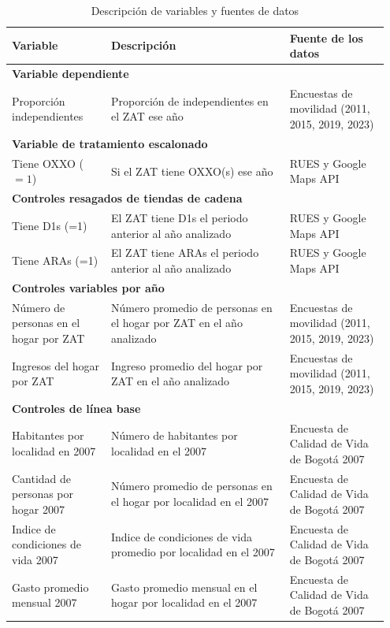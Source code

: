 \documentclass{article}
\begin{document}
\begin{longtable}{p{0.25\linewidth} p{0.45\linewidth} p{0.25\linewidth}}
\caption{Descripción de variables y fuentes de datos}
\label{tab:variables_descripcion}
\\
\toprule
\textbf{Variable} & \textbf{Descripción} & \textbf{Fuente de los datos} \\
\midrule
\endhead
\midrule
\multicolumn{3}{l}{\textbf{Variable dependiente}} \\
\midrule
Proporción independientes & Proporción de independientes en el ZAT ese año & Encuestas de movilidad (2011, 2015, 2019, 2023) \\
\midrule
\multicolumn{3}{l}{\textbf{Variable de tratamiento escalonado}} \\
\midrule
Tiene OXXO ($=1$) & Si el ZAT tiene OXXO(s) ese año & RUES y Google Maps API \\
\midrule
\multicolumn{3}{l}{\textbf{Controles resagados de tiendas de cadena}} \\
\midrule
Tiene D1s (=1) & El ZAT tiene D1s el periodo anterior al año analizado & RUES y Google Maps API \\
\midrule
Tiene ARAs (=1) & El ZAT tiene ARAs el periodo anterior al año analizado & RUES y Google Maps API \\
\midrule
\multicolumn{3}{l}{\textbf{Controles variables por año}} \\
\midrule
Número de personas en el hogar por ZAT & Número promedio de personas en el hogar por ZAT en el año analizado & Encuestas de movilidad (2011, 2015, 2019, 2023) \\
\midrule
Ingresos del hogar por ZAT & Ingreso promedio del hogar por ZAT en el año analizado & Encuestas de movilidad (2011, 2015, 2019, 2023) \\
\midrule
\multicolumn{3}{l}{\textbf{Controles de línea base}} \\
\midrule
Habitantes por localidad en 2007 & Número de habitantes por localidad en el 2007 & Encuesta de Calidad de Vida de Bogotá 2007 \\
\midrule
Cantidad de personas por hogar 2007 & Número promedio de personas en el hogar por localidad en el 2007 & Encuesta de Calidad de Vida de Bogotá 2007 \\
\midrule
Indice de condiciones de vida 2007 & Indice de condiciones de vida promedio por localidad en el 2007 & Encuesta de Calidad de Vida de Bogotá 2007 \\
\midrule
Gasto promedio mensual 2007 & Gasto promedio mensual en el hogar por localidad en el 2007 & Encuesta de Calidad de Vida de Bogotá 2007 \\

\end{longtable}
\end{document}
